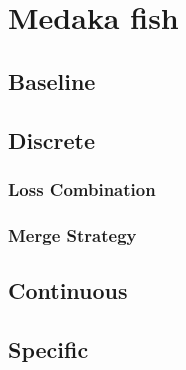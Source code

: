 \newpage
\section{Medaka fish}
\label{sec:medaka_supplementary}
\subsection{Baseline}
\label{subsec:baseline_medaka}

\newpage

\subsection{Discrete}
\label{subsec:discrete_medaka}
\subsubsection*{Loss Combination}


\subsubsection*{Merge Strategy}


\newpage

\subsection{Continuous}
\label{subsec:continous_medaka}


\newpage

\subsection{Specific}
\label{subsec:specific_combination_medaka}

\newpage

